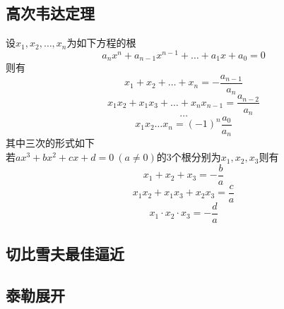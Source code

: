 \documentclass[UTF8]{ctexart}
\begin{document}
		\subsection{高次韦达定理}
			设$x_1,x_2,\dots,x_n$为如下方程的根
			\[a_n x^n+a_{n-1} x^{n-1}+\dots+a_1 x+a_0=0\]
			则有
			\[x_1+x_2+\dots+x_n=-\frac{a_{n-1}}{a_n}\]
			\[x_1 x_2+x_1 x_3+\dots+x_n x_{n-1}=\frac{a_{n-2}}{a_n}\]
			\[\dots\]
			\[x_1 x_2\dots x_n=(-1)^n \frac{a_0}{a_n}\]
			其中三次的形式如下\\
			若$ax^3+bx^2+cx+d=0\ (a\neq 0)$的3个根分别为$x_1,x_2,x_3$则有
			\[x_1+x_2+x_3=-\frac{b}{a}\]
			\[x_1 x_2+x_1 x_3+x_2 x_3=\frac{c}{a}\]
			\[x_1\cdot x_2\cdot x_3=-\frac{d}{a}\]		
		\subsection{切比雪夫最佳逼近}
		\subsection{泰勒展开}
\end{document}

